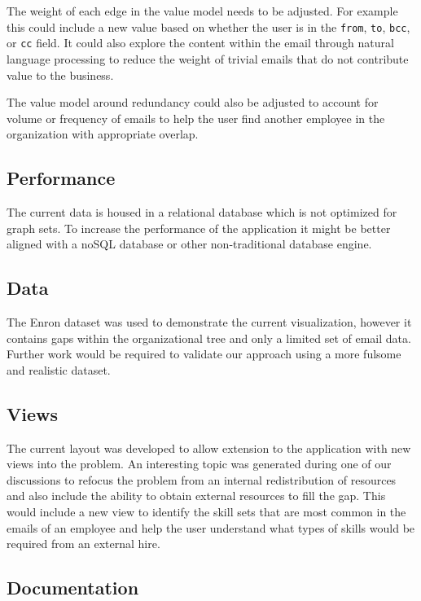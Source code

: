\documentclass[journal]{vgtc}                %
\begin{document}
The weight of each edge in the value model needs to be adjusted.  For example this could include a new value based on whether the user is in the \texttt{from}, \texttt{to}, \texttt{bcc}, or \texttt{cc} field.  It could also explore the content within the email through natural language processing to reduce the weight of trivial emails that do not contribute value to the business.

The value model around redundancy could also be adjusted to account for volume or frequency of emails to help the user find another employee in the organization with appropriate overlap.

\subsection{Performance}

The current data is housed in a relational database which is not optimized for graph sets.  To increase the performance of the application it might be better aligned with a noSQL database or other non-traditional database engine.

\subsection{Data}

The Enron dataset was used to demonstrate the current visualization, however it contains gaps within the organizational tree and only a limited set of email data.  Further work would be required to validate our approach using a more fulsome and realistic dataset.

\subsection{Views}

The current layout was developed to allow extension to the application with new views into the problem.  An interesting topic was generated during one of our discussions to refocus the problem from an internal redistribution of resources and also include the ability to obtain external resources to fill the gap.  This would include a new view to identify the skill sets that are most common in the emails of an employee and help the user understand what types of skills would be required from an external hire.

\subsection{Documentation}
\end{document}
